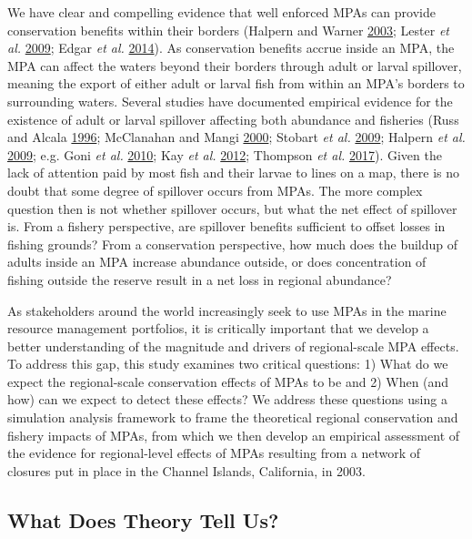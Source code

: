 \documentclass[twoside,12pt,final]{ucthesis-CA2012}
\begin{document}
\begin{ucmainmatter}
We have clear and compelling evidence that well enforced MPAs can
provide conservation benefits within their borders (Halpern and Warner
\protect\hyperlink{ref-Halpern2003}{2003}; Lester \emph{et al.}
\protect\hyperlink{ref-Lester2009}{2009}; Edgar \emph{et al.}
\protect\hyperlink{ref-Edgar2014}{2014}). As conservation benefits
accrue inside an MPA, the MPA can affect the waters beyond their borders
through adult or larval spillover, meaning the export of either adult or
larval fish from within an MPA's borders to surrounding waters. Several
studies have documented empirical evidence for the existence of adult or
larval spillover affecting both abundance and fisheries (Russ and Alcala
\protect\hyperlink{ref-Russ1996}{1996}; McClanahan and Mangi
\protect\hyperlink{ref-McClanahan2000}{2000}; Stobart \emph{et al.}
\protect\hyperlink{ref-Stobart2009}{2009}; Halpern \emph{et al.}
\protect\hyperlink{ref-Halpern2009}{2009}; e.g. Goni \emph{et al.}
\protect\hyperlink{ref-Goni2010}{2010}; Kay \emph{et al.}
\protect\hyperlink{ref-Kay2012}{2012}; Thompson \emph{et al.}
\protect\hyperlink{ref-Thompson2017}{2017}). Given the lack of attention
paid by most fish and their larvae to lines on a map, there is no doubt
that some degree of spillover occurs from MPAs. The more complex
question then is not whether spillover occurs, but what the net effect
of spillover is. From a fishery perspective, are spillover benefits
sufficient to offset losses in fishing grounds? From a conservation
perspective, how much does the buildup of adults inside an MPA increase
abundance outside, or does concentration of fishing outside the reserve
result in a net loss in regional abundance?

As stakeholders around the world increasingly seek to use MPAs in the
marine resource management portfolios, it is critically important that
we develop a better understanding of the magnitude and drivers of
regional-scale MPA effects. To address this gap, this study examines two
critical questions: 1) What do we expect the regional-scale conservation
effects of MPAs to be and 2) When (and how) can we expect to detect
these effects? We address these questions using a simulation analysis
framework to frame the theoretical regional conservation and fishery
impacts of MPAs, from which we then develop an empirical assessment of
the evidence for regional-level effects of MPAs resulting from a network
of closures put in place in the Channel Islands, California, in 2003.

\subsection{What Does Theory Tell Us?}\label{what-does-theory-tell-us}


\end{ucmainmatter}
\end{document}
